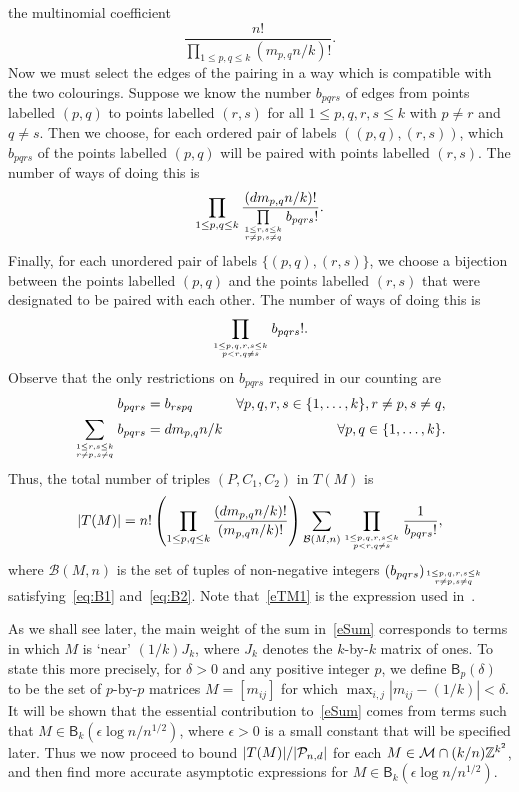 \documentclass[12pt]{article}
\newcommand{\lab}[1]{\label{#1}}
\def\P{{\cal P}}
\def\BZ{{\mathbb Z}}
\def\Pnd{\P_{n,d}}
\def\be{\begin{equation}}
\def\ee{\end{equation}}
\newcommand{\bel}[1]{\be\lab{#1}}
\def\Z{\BZ}
\def\M{{\cal M}}
\newcommand{\cB} {\ensuremath{\mathcal B}}
\newcommand{\B} {\ensuremath{\mathsf B}}
\begin{document}
the multinomial coefficient
\[
\frac{n!}{\prod\limits_{1\le p,q\le k} (m_{p,q}n/k)!}.
\]
Now we must select the edges of the pairing in a way which is compatible with the two colourings.
Suppose we know the number $b_{pqrs}$ of edges from points 
labelled $(p,q)$ to points labelled $(r,s)$ for all $1\le p,q,r,s\le k$
with $p\ne r$ and $q\ne s$. Then we choose,
 for each ordered pair of labels $((p,q),(r,s))$, which
$b_{pqrs}$ of the points labelled $(p,q)$ will be paired with points 
labelled $(r,s)$. The number of ways of doing this is
\[
\prod_{1\le p,q\le k}\frac{(dm_{p,q}n/k)!}
{\prod\limits_{1\le r,s\le k\atop r\ne p,s\ne q} b_{pqrs}!}.
\]
Finally, for each unordered pair 
of labels $\{(p,q),(r,s)\}$, we choose a bijection between the points 
labelled $(p,q)$ and the points 
labelled $(r,s)$ that were designated to be paired with each other.
The number of ways of doing this is
\[
\prod_{1\le p,q,r,s\le k\atop p<r,q\ne s} b_{pqrs}!.
\]
Observe that the only restrictions on $b_{pqrs}$ required in our counting are
%
\begin{align}
b_{pqrs}&=b_{rspq} & \forall p,q,r,s\in\{1,\ldots,k\}, r\ne p, s\ne q,
\label{eq:B1}
\\
\sum_{1\le r,s\le k\atop r\ne p,s\ne q} b_{pqrs} &= d m_{p,q} n/k & \forall p,q\in\{1,\ldots,k\}.
\label{eq:B2}
\end{align}
%
Thus, the total number of triples $(P,C_1,C_2)$ in $T(M)$ is
\bel{eTM1}
|T(M)|=n!
\left(\prod_{1\le p,q\le k} \frac{(dm_{p,q}n/k)!}{(m_{p,q}n/k)!}\right)
\sum_{\cB(M,n)} \prod_{1\le p,q,r,s\le k\atop p<r,q\ne s} \frac{1}{b_{pqrs}!},
\ee
where $\cB(M,n)$ is the set of tuples of non-negative integers $(b_{pqrs})_{1\le p,q,r,s\le k\atop r\ne p, s\ne q}$ satisfying~\eqref{eq:B1} and~\eqref{eq:B2}. Note that~\eqref{eTM1} is the expression used in~\cite{AM}.

As we shall see later, the main weight of the sum in~\eqref{eSum} corresponds to terms in which $M$ is `near' $(1/k)J_k$, where $J_k$ denotes the $k$-by-$k$ matrix of ones.
To state this more precisely, for $\delta>0$ and any positive integer $p$, we define $\B_p(\delta)$ to be the set of $p$-by-$p$ matrices $M=[m_{ij}]$ for which $\max_{i,j}|m_{ij}-(1/k)|<\delta$.
It will be shown that the essential contribution to~\eqref{eSum} comes from terms such that $M\in \B_k(\epsilon\log n/n^{1/2})$, where $\epsilon>0$ is a small constant that will be specified later.
Thus we now proceed to bound $|T(M)|/|\Pnd|$ for each $M\in\M\cap(k/n)\Z^{k^2}$, and then find more accurate asymptotic expressions for $M\in \B_k(\epsilon\log n/n^{1/2})$.
\end{document}
